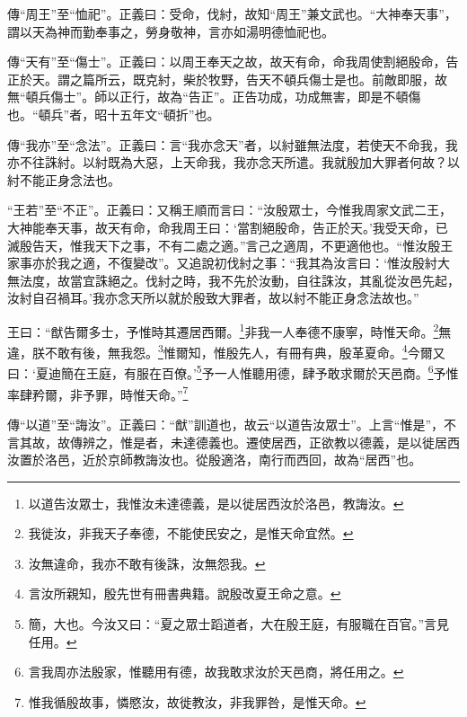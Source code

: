 {\noindent\zhuan{}\fzbyks 傳“周王”至“恤祀”。正義曰：受命，伐紂，故知“周王”兼文武也。“大神奉天事”，謂以天為神而勤奉事之，勞身敬神，言亦如湯明德恤祀也。 \par}

{\noindent\zhuan{}\fzbyks 傳“天有”至“傷士”。正義曰：以周王奉天之故，故天有命，命我周使割絕殷命，告正於天。謂之篇所云，既克紂，柴於牧野，告天不頓兵傷士是也。前敵即服，故無“頓兵傷士”。師以正行，故為“告正”。正告功成，功成無害，即是不頓傷也。“頓兵”者，昭十五年文“頓折”也。 \par}

{\noindent\zhuan{}\fzbyks 傳“我亦”至“念法”。正義曰：言“我亦念天”者，以紂雖無法度，若使天不命我，我亦不往誅紂。以紂既為大惡，上天命我，我亦念天所遣。我就殷加大罪者何故？以紂不能正身念法也。 \par}

{\noindent\shu{}\fzkt “王若”至“不正”。正義曰：又稱王順而言曰：“汝殷眾士，今惟我周家文武二王，大神能奉天事，故天有命，命我周王曰：‘當割絕殷命，告正於天。’我受天命，已滅殷告天，惟我天下之事，不有二處之適。”言己之適周，不更適他也。“惟汝殷王家事亦於我之適，不復變改”。又追說初伐紂之事：“我其為汝言曰：‘惟汝殷紂大無法度，故當宜誅絕之。伐紂之時，我不先於汝動，自往誅汝，其亂從汝邑先起，汝紂自召禍耳。’我亦念天所以就於殷致大罪者，故以紂不能正身念法故也。” \par}

王曰：“猷告爾多士，予惟時其遷居西爾。\footnote{以道告汝眾士，我惟汝未達德義，是以徙居西汝於洛邑，教誨汝。}非我一人奉德不康寧，時惟天命。\footnote{我徙汝，非我天子奉德，不能使民安之，是惟天命宜然。}無違，朕不敢有後，無我怨。\footnote{汝無違命，我亦不敢有後誅，汝無怨我。}惟爾知，惟殷先人，有冊有典，殷革夏命。\footnote{言汝所親知，殷先世有冊書典籍。說殷改夏王命之意。}今爾又曰：‘夏迪簡在王庭，有服在百僚。’\footnote{簡，大也。今汝又曰：“夏之眾士蹈道者，大在殷王庭，有服職在百官。”言見任用。}予一人惟聽用德，肆予敢求爾於天邑商。\footnote{言我周亦法殷家，惟聽用有德，故我敢求汝於天邑商，將任用之。}予惟率肆矜爾，非予罪，時惟天命。”\footnote{惟我循殷故事，憐愍汝，故徙教汝，非我罪咎，是惟天命。}

{\noindent\zhuan{}\fzbyks 傳“以道”至“誨汝”。正義曰：“猷”訓道也，故云“以道告汝眾士”。上言“惟是”，不言其故，故傳辨之，惟是者，未達德義也。遷使居西，正欲教以德義，是以徙居西汝置於洛邑，近於京師教誨汝也。從殷適洛，南行而西回，故為“居西”也。 \par}

